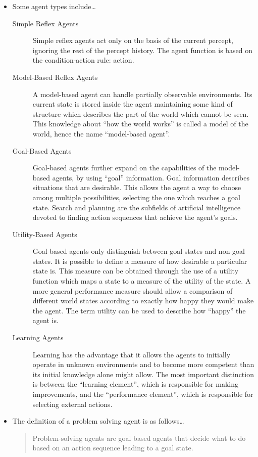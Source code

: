\begin{itemize}
        \item Some agent types include\ldots
            \begin{description}
                \item[Simple Reflex Agents] Simple reflex agents act only on the basis of the current percept, ignoring the rest of the percept history. The agent function is based on the condition-action rule:  action.
                \item[Model-Based Reflex Agents] A model-based agent can handle partially observable environments. Its current state is stored inside the agent maintaining some kind of structure which describes the part of the world which cannot be seen. This knowledge about ``how the world works'' is called a model of the world, hence the name ``model-based agent''.
                \item[Goal-Based Agents] Goal-based agents further expand on the capabilities of the model-based agents, by using ``goal'' information. Goal information describes situations that are desirable. This allows the agent a way to choose among multiple possibilities, selecting the one which reaches a goal state. Search and planning are the subfields of artificial intelligence devoted to finding action sequences that achieve the agent's goals.
                \item[Utility-Based Agents] Goal-based agents only distinguish between goal states and non-goal states. It is possible to define a measure of how desirable a particular state is. This measure can be obtained through the use of a utility function which maps a state to a measure of the utility of the state. A more general performance measure should allow a comparison of different world states according to exactly how happy they would make the agent. The term utility can be used to describe how ``happy'' the agent is.
                \item[Learning Agents] Learning has the advantage that it allows the agents to initially operate in unknown environments and to become more competent than its initial knowledge alone might allow. The most important distinction is between the ``learning element'', which is responsible for making improvements, and the ``performance element'', which is responsible for selecting external actions.
            \end{description}

            \item The definition of a problem solving agent is as follows\ldots
                \begin{quote}
                    Problem-solving agents are goal based agents that decide what to do based on an action sequence leading to a goal state.
                \end{quote}
\end{itemize}
